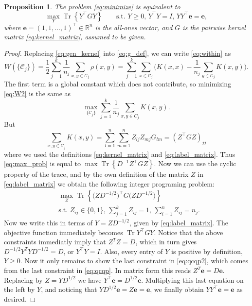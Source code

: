 \documentclass{article}
\newtheorem{proposition}[theorem]{Proposition}
\DeclareMathOperator{\Tr}{Tr}
\newcommand\kk{K}
\newcommand\C{{\mathcal{C}}}
\newcommand\Zt{Y}
\begin{document}
\begin{proposition} 
\label{th:qcqp2}
The problem \eqref{eq:minimize} is equivalent to
\begin{equation}
\label{eq:qcqp2}
\max_{\Zt} \Tr \left\{ \Zt^\top G \Zt \right\}  \qquad
\mbox{s.t. $\Zt \ge 0$, $\Zt^\top \Zt = I$, 
$\Zt \Zt^\top \bm{e} = \bm{e}$},
\end{equation}
where $\bm{e} = (1,1,\dots,1)^\top \in \mathbb{R}^n$ is the all-ones vector,
and $G$ is the pairwise kernel matrix \eqref{eq:kernel_matrix}, assumed
to be given.
\end{proposition}
\begin{proof}
Replacing \eqref{eq:gen_kernel}  into
\eqref{eq:g_def},  
we can write \eqref{eq:within} as
\begin{equation}
\label{eq:W2}
W(\{ \C_j \} )
= \dfrac{1}{2} \sum_{j=1}^k \dfrac{1}{n_j} \sum_{x,y \in \C_j} \rho(x,y)
= \sum_{j=1}^k \sum_{x \in \C_j}  \bigg(
\kk(x,x) - \dfrac{1}{n_j} \sum_{y \in \C_j} \kk(x,y) \bigg).
\end{equation}
The first term is a global constant 
which does not contribute,
so minimizing \eqref{eq:W2} is the same as
\begin{equation}
\label{eq:max_prob}
\max_{ \{ \C_j \} } \sum_{j=1}^k \dfrac{1}{n_j} \sum_{x,y\in C_j} \kk(x,y) .
\end{equation}
But 
\begin{equation}
\sum_{x, y \in \C_j} \kk(x, y) =
\sum_{l=1}^{n} \sum_{m=1}^{n} Z_{lj} Z_{mj} G_{lm} = 
(Z^\top G Z)_{jj}
\end{equation}
where we used the definitions \eqref{eq:kernel_matrix} and
\eqref{eq:label_matrix}. Thus \eqref{eq:max_prob} is equal to
$\max \Tr \left\{ D^{-1} Z^\top G Z \right\}$. Now we can
use the cyclic property
of the trace, and by the own definition of the matrix $Z$
in \eqref{eq:label_matrix} we obtain the following integer
programing problem:
\begin{equation}\label{eq:qcqp}
\begin{aligned}
& \max_{Z} \Tr\left\{ \big( Z D^{-1/2}\big)^\top G 
\big( ZD^{-1/2} \big) 
\right\} \\
&\mbox{s.t. $Z_{ij} \in \{0,1\}$, $\sum_{j=1}^k Z_{ij} = 1$, 
$\sum_{i=1}^n Z_{ij} = n_j$.}
\end{aligned}
\end{equation}
Now we write this in terms of $Y = Z D^{-1/2}$, given by
\eqref{eq:label_matrix}. The objective function immediately becomes
$\Tr Y^\top G Y$. Notice that the above constraints
immediatly imply that $Z^T Z = D$, which in turn gives
$D^{-1/2} Y^T Y D^{-1/2} = D$, or $Y^\top Y = I$. 
Also, every entry of $Y$ is positive by definition,
$Y \ge 0$. Now it only remains to show the last 
constraint in \eqref{eq:qcqp2}, which comes from the last
constraint in \eqref{eq:qcqp}. In matrix form this reads
$Z^T \bm{e} = D \bm{e}$. Replacing by $Z=YD^{1/2}$ we have
$Y^\top \bm{e} = D^{1/2} \bm{e}$. Multiplying this last equation
on the left by $Y$, and noticing
that $Y D^{1/2} \bm{e} = Z \bm{e} = \bm{e}$, we finally obtain
$Y Y^\top \bm{e} = \bm{e}$ as desired.
\end{proof}
\end{document}
